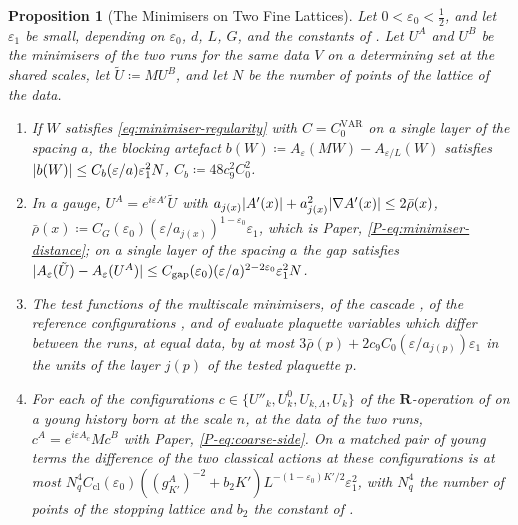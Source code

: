\documentclass[11pt]{preprint}
\DeclarePairedDelimiter{\abs}{\lvert}{\rvert}
\numberwithin{equation}{section}
\newtheorem{proposition}{Proposition}
\theoremstyle{definition}
\theoremstyle{remark}
\theoremstyle{plain}
\begin{document}
\begin{proposition}[The Minimisers on Two Fine Lattices]\label{prop:minimisers}
Let $0 < \varepsilon_0 < \frac12$, and let $\varepsilon_1$ be small, depending on $\varepsilon_0$, $d$, $L$, $G$, and the constants of \cite{BalabanVAR,BalabanREG,BalabanAVG,BalabanPRT2,BalabanPBG}. Let $U^A$ and $U^B$ be the minimisers of the two runs for the same data $V$ on a determining set at the shared scales, let $\tilde U \coloneqq MU^B$, and let $N$ be the number of points of the lattice of the data.
\begin{enumerate}[label=(\alph*)]
\item If $W$ satisfies \eqref{eq:minimiser-regularity} with $C = C^{\mathrm{VAR}}_0$ on a single layer of the spacing $a$, the blocking artefact $b(W) \coloneqq A_\varepsilon(MW) - A_{\varepsilon/L}(W)$ satisfies $\abs{b(W)} \leq C_b(\varepsilon/a)\varepsilon_1^2N$, $C_b \coloneqq 48c_9^2C_0^2$.
\item In a gauge, $U^A = e^{i\varepsilon A'}\tilde U$ with $a_{j(x)}\abs{A'(x)} + a_{j(x)}^2\abs{\nabla A'(x)} \leq 2\bar\rho(x)$, $\bar\rho(x) \coloneqq C_G(\varepsilon_0)(\varepsilon/a_{j(x)})^{1-\varepsilon_0}\varepsilon_1$, which is Paper, \eqref{P-eq:minimiser-distance}; on a single layer of the spacing $a$ the gap satisfies $\abs{A_\varepsilon(\tilde U) - A_\varepsilon(U^A)} \leq C_{\mathrm{gap}}(\varepsilon_0)(\varepsilon/a)^{2-2\varepsilon_0}\varepsilon_1^2N$.
\item The test functions of the multiscale minimisers, of the cascade \cite[(1.22)--(1.24), p.~181]{BalabanLFR1}, of the reference configurations \cite[(1.27), p.~182]{BalabanLFR1}, and of \cite[(1.75), p.~193]{BalabanLFR1} evaluate plaquette variables which differ between the runs, at equal data, by at most $3\bar\rho(p) + 2c_9C_0(\varepsilon/a_{j(p)})\varepsilon_1$ in the units of the layer $j(p)$ of the tested plaquette $p$.
\item For each of the configurations $c \in \{U''_k, U^0_k, U_{k,\Lambda}, U_k\}$ of the $\mathbf R$-operation of \cite[\S1]{BalabanLFR2} on a young history born at the scale $n$, at the data of the two runs, $c^A = e^{i\varepsilon A_c}Mc^B$ with Paper, \eqref{P-eq:coarse-side}. On a matched pair of young terms the difference of the two classical actions at these configurations is at most $N_q^4C_{\mathrm{cl}}(\varepsilon_0)((g^A_{K'})^{-2} + b_2K')L^{-(1-\varepsilon_0)K'/2}\varepsilon_1^2$, with $N_q^4$ the number of points of the stopping lattice and $b_2$ the constant of \cite[(2.6), p.~255]{BalabanCRE}.
\end{enumerate}
\end{proposition}
\end{document}
